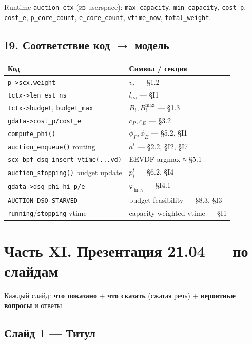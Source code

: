 \documentclass[11pt,a4paper]{article}
\begin{document}
Runtime \texttt{auction\_ctx} (из userspace): \texttt{max\_capacity},
\texttt{min\_capacity}, \texttt{cost\_p}, \texttt{cost\_e},
\texttt{p\_core\_count}, \texttt{e\_core\_count}, \texttt{vtime\_now},
\texttt{total\_weight}.

\subsection{I9. Соответствие код $\to$ модель}

\begin{center}\small
\begin{tabular}{@{}ll@{}}
\toprule
Код & Символ / секция\\
\midrule
\texttt{p->scx.weight}                      & $v_i$ — §1.2\\
\texttt{tctx->len\_est\_ns}                 & $l_{ns}$ — §I1\\
\texttt{tctx->budget}, \texttt{budget\_max} & $B_i, B_i^{\max}$ — §1.3\\
\texttt{gdata->cost\_p/cost\_e}             & $c_P, c_E$ — §3.2\\
\texttt{compute\_phi()}                     & $\phi_P, \phi_E$ — §5.2, §I1\\
\texttt{auction\_enqueue()} routing         & $a^t$ — §2.2, §I2, §I7\\
\texttt{scx\_bpf\_dsq\_insert\_vtime(...vd)}& EEVDF argmax ≈ §5.1\\
\texttt{auction\_stopping()} budget update  & $p_i^t$ — §6.2, §I4\\
\texttt{gdata->dsq\_phi\_hi\_p/e}           & $\varphi_{\text{hi},\kappa}$ — §I4.1\\
\texttt{AUCTION\_DSQ\_STARVED}              & budget-feasibility — §8.3, §I3\\
\texttt{running}/\texttt{stopping} vtime    & capacity-weighted vtime — §I1\\
\bottomrule
\end{tabular}
\end{center}

\clearpage
\section{Часть XI. Презентация 21.04 — по слайдам}

Каждый слайд: \textbf{что показано} + \textbf{что сказать} (сжатая
речь) + \textbf{вероятные вопросы} и ответы.

\subsection*{Слайд 1 — Титул}
\end{document}
